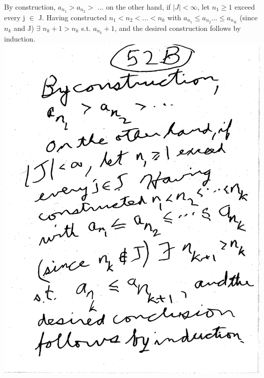 \documentclass[10pt,a4paper]{article}
\begin{document}
\newpage
By construction, $a_{n_{1}} > a_{n_{2}} >$ ... on the other hand, if $|J| < \infty$, let $n_1 \geq 1$ exceed every j $\in$ J. Having constructed $n_1 < n_2 < ... < n_k$ with $a_{n_{1}} \leq a_{n_{2}} ... \leq a_{n_{K}}$ (since $n_k$ and J) $\exists$ $n_k + 1 > n_k$ s.t. $a_{n_{k}} + 1$, and the desired construction follows by induction.
\includegraphics[scale=.5]{Pages/LC_8}
\end{document}
